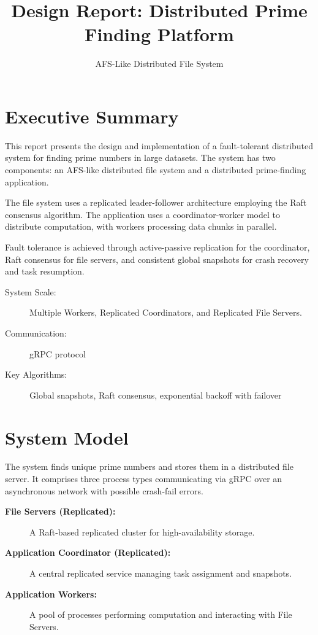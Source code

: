 \documentclass[11pt, a4paper]{article}
\title{Design Report: Distributed Prime Finding Platform}
\author{AFS-Like Distributed File System}
\date{}
\begin{document}
\maketitle
\thispagestyle{empty}
\pagestyle{headings}

\section{Executive Summary}

This report presents the design and implementation of a fault-tolerant distributed system for finding prime numbers in large datasets. The system has two components: an AFS-like distributed file system and a distributed prime-finding application.

The file system uses a replicated leader-follower architecture employing the Raft consensus algorithm. The application uses a coordinator-worker model to distribute computation, with workers processing data chunks in parallel.

Fault tolerance is achieved through active-passive replication for the coordinator, Raft consensus for file servers, and consistent global snapshots for crash recovery and task resumption.

\begin{description}
    \item[System Scale:] Multiple Workers, Replicated Coordinators, and Replicated File Servers.
    \item[Communication:] gRPC protocol
    \item[Key Algorithms:] Global snapshots, Raft consensus, exponential backoff with failover
\end{description}

\section{System Model}

The system finds unique prime numbers and stores them in a distributed file server. It comprises three process types communicating via gRPC over an asynchronous network with possible crash-fail errors.

\begin{description}
    \item[\textbf{File Servers (Replicated):}] A Raft-based replicated cluster for high-availability storage.
    \item[\textbf{Application Coordinator (Replicated):}] A central replicated service managing task assignment and snapshots.
    \item[\textbf{Application Workers:}] A pool of processes performing computation and interacting with File Servers.
\end{description}
\end{document}
